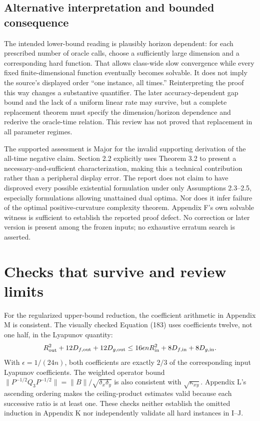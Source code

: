 \documentclass[10pt]{article}
\begin{document}
\subsection*{Alternative interpretation and bounded consequence}
The intended lower-bound reading is plausibly horizon dependent: for each prescribed number of oracle calls, choose a sufficiently large dimension and a corresponding hard function. That allows class-wide slow convergence while every fixed finite-dimensional function eventually becomes solvable. It does not imply the source’s displayed order “one instance, all times.” Reinterpreting the proof this way changes a substantive quantifier. The later accuracy-dependent gap bound and the lack of a uniform linear rate may survive, but a complete replacement theorem must specify the dimension/horizon dependence and rederive the oracle-time relation. This review has not proved that replacement in all parameter regimes.\par
The supported assessment is Major for the invalid supporting derivation of the all-time negative claim. Section 2.2 explicitly uses Theorem 3.2 to present a necessary-and-sufficient characterization, making this a technical contribution rather than a peripheral display error. The report does not claim to have disproved every possible existential formulation under only Assumptions 2.3–2.5, especially formulations allowing unattained dual optima. Nor does it infer failure of the optimal positive-curvature complexity theorem. Appendix F’s own solvable witness is sufficient to establish the reported proof defect. No correction or later version is present among the frozen inputs; no exhaustive erratum search is asserted.\par
\section*{Checks that survive and review limits}
For the regularized upper-bound reduction, the coefficient arithmetic in Appendix M is consistent. The visually checked Equation (183) uses coefficients twelve, not one half, in the Lyapunov quantity: \[R_{\rm out}^2+12D_{f,\rm out}+12D_{g,\rm out}
\leq16\epsilon n R_{\rm in}^2+8D_{f,\rm in}+8D_{g,\rm in}.\] With \(\epsilon=1/(24n)\), both coefficients are exactly \(2/3\) of the corresponding input Lyapunov coefficients. The weighted operator bound \(\|P^{-1/2}Q_3P^{-1/2}\|=\|B\|/\sqrt{\delta_x\delta_y}\) is also consistent with \(\sqrt{\kappa_{xy}}\). Appendix L’s ascending ordering makes the ceiling-product estimates valid because each successive ratio is at least one. These checks neither establish the omitted induction in Appendix K nor independently validate all hard instances in I–J.\par
\end{document}
